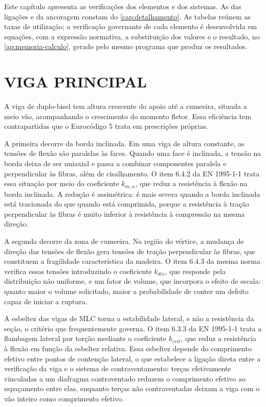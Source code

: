 Este capítulo apresenta as verificações dos elementos e dos sistemas. As das
ligações e da ancoragem constam do \autoref{cap:detalhamento}. As tabelas
reúnem as taxas de utilização; a verificação governante de cada elemento é
desenvolvida em equações, com a expressão normativa, a substituição dos valores
e o resultado, no \autoref{ap:memoria-calculo}, gerado pelo mesmo programa que
produz os resultados.

\section{VIGA PRINCIPAL}\label{sec:verif-viga}\label{sec:vigas-secao-variavel}

A viga de duplo-bisel tem altura crescente do apoio até a cumeeira, situada a
meio vão, acompanhando o crescimento do momento fletor. Essa eficiência tem
contrapartidas que o Eurocódigo 5 trata em prescrições próprias.

A primeira decorre da borda inclinada. Em uma viga de altura constante, as
tensões de flexão são paralelas às faces. Quando uma face é inclinada, a tensão
na borda deixa de ser uniaxial e passa a combinar componentes paralela e
perpendicular às fibras, além de cisalhamento. O item 6.4.2 da
EN 1995-1-1 \cite{EN1995-1-1:2004} trata essa situação por meio do coeficiente
$k_{m,\alpha}$, que reduz a resistência à flexão na borda inclinada. A redução é
assimétrica: é mais severa quando a borda inclinada está tracionada do que
quando está comprimida, porque a resistência à tração perpendicular às fibras é
muito inferior à resistência à compressão na mesma direção.

A segunda decorre da zona de cumeeira. Na região do vértice, a mudança de
direção das tensões de flexão gera tensões de tração perpendicular às fibras,
que constituem a fragilidade característica da madeira. O item 6.4.3 da mesma
norma verifica essas tensões introduzindo o coeficiente $k_{dis}$, que responde
pela distribuição não uniforme, e um fator de volume, que incorpora o efeito de
escala: quanto maior o volume solicitado, maior a probabilidade de conter um
defeito capaz de iniciar a ruptura.

A esbeltez das vigas de MLC torna a estabilidade lateral, e não a resistência
da seção, o critério que frequentemente governa. O item 6.3.3 da
EN 1995-1-1 \cite{EN1995-1-1:2004} trata a flambagem lateral por torção
mediante o coeficiente $k_{crit}$, que reduz a resistência à flexão em função da
esbeltez relativa. Essa esbeltez depende do comprimento efetivo entre pontos de
contenção lateral, o que estabelece a ligação direta entre a verificação da
viga e o sistema de contraventamento: terças efetivamente vinculadas a um
diafragma contraventado reduzem o comprimento efetivo ao espaçamento entre
elas, enquanto terças não contraventadas deixam a viga com o vão inteiro como
comprimento efetivo.

